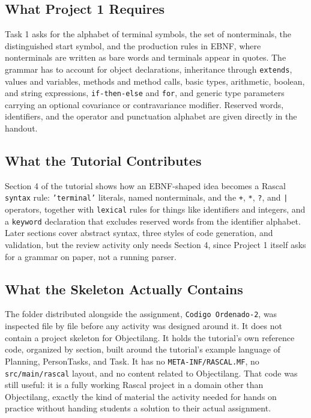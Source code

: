 \documentclass[11pt]{article}
\begin{document}
\subsection{What Project 1 Requires}

Task 1 asks for the alphabet of terminal symbols, the set of nonterminals,
the distinguished start symbol, and the production rules in EBNF, where
nonterminals are written as bare words and terminals appear in quotes. The
grammar has to account for object declarations, inheritance through
\texttt{extends}, values and variables, methods and method calls, basic
types, arithmetic, boolean, and string expressions, \texttt{if-then-else}
and \texttt{for}, and generic type parameters carrying an optional
covariance or contravariance modifier. Reserved words, identifiers, and the
operator and punctuation alphabet are given directly in the handout.

\subsection{What the Tutorial Contributes}

Section 4 of the tutorial shows how an EBNF-shaped idea becomes a Rascal
\texttt{syntax} rule: \texttt{'terminal'} literals, named nonterminals, and
the \texttt{+}, \texttt{*}, \texttt{?}, and \texttt{|} operators, together
with \texttt{lexical} rules for things like identifiers and integers, and a
\texttt{keyword} declaration that excludes reserved words from the
identifier alphabet. Later sections cover abstract syntax, three styles of
code generation, and validation, but the review activity only needs Section
4, since Project 1 itself asks for a grammar on paper, not a running parser.

\subsection{What the Skeleton Actually Contains}

The folder distributed alongside the assignment, \texttt{Codigo
Ordenado-2}, was inspected file by file before any activity was designed
around it. It does not contain a project skeleton for Objectilang. It holds
the tutorial's own reference code, organized by section, built around the
tutorial's example language of Planning, PersonTasks, and Task. It has no
\texttt{META-INF/RASCAL.MF}, no \texttt{src/main/rascal} layout, and no
content related to Objectilang. That code was still useful: it is a fully
working Rascal project in a domain other than Objectilang, exactly the kind
of material the activity needed for hands on practice without handing
students a solution to their actual assignment.
\end{document}
